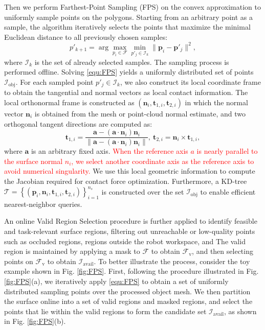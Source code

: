 Then we perform Farthest-Point Sampling (FPS) on the convex approximation to uniformly sample points on the polygons. Starting from an arbitrary point as a sample, the algorithm iteratively selects the points that maximize the minimal Euclidean distance to all previously chosen samples:
\begin{equation}
p'_{k+1} = \arg\max_{p_i \in \mathcal{F}} \min_{p'_j \in \mathcal{I}_{k}} \|\boldsymbol{p}_i - \boldsymbol{p}'_j\|^2, \label{equ:FPS}
\end{equation}
where $\mathcal{I}_{k}$ is the set of already selected samples. The sampling process is performed offline. Solving \eqref{equ:FPS} yields a uniformly distributed set of points $\mathcal{I}_{\text{obj}}$. For each sampled point $p'_j \in \mathcal{I}_{k}$, we also construct its local coordinate frame to obtain the tangential and normal vectors as local contact information. The local orthonormal frame is constructed as $(\boldsymbol{n}_i, \boldsymbol{t}_{1,i}, \boldsymbol{t}_{2,i})$ in which the normal vector $\boldsymbol{n}_i$ is obtained from the mesh or point-cloud normal estimate, and two orthogonal tangent directions are computed as:
\begin{equation}
\boldsymbol{t}_{1,i} =
\frac{\boldsymbol{a} - (\boldsymbol{a} \cdot \boldsymbol{n}_i)\boldsymbol{n}_i}
{\|\boldsymbol{a} - (\boldsymbol{a} \cdot \boldsymbol{n}_i)\boldsymbol{n}_i\|}, \
\boldsymbol{t}_{2,i} = \boldsymbol{n}_i \times \boldsymbol{t}_{1,i},
\end{equation}
where $\boldsymbol{a}$ is an arbitrary fixed axis. \textcolor{red}{When the reference axis $a$ is nearly parallel to the surface normal $n_i$, we select another coordinate axis as the reference axis to avoid numerical singularity.} We use this local geometric information to compute the Jacobian required for contact force optimization. Furthermore, a KD-tree $\mathcal{T}=\left \{ (\boldsymbol{p}_i,\boldsymbol{n}_i, \boldsymbol{t}_{1,i}, \boldsymbol{t}_{2,i}) \right \}^{n_s}_{i=1} $ is constructed over the set $\mathcal{I}_{\text{obj}}$ to enable efficient nearest-neighbor queries.

An online Valid Region Selection procedure is further applied to identify feasible and task-relevant surface regions, filtering out unreachable or low-quality points such as occluded regions, regions outside the robot workspace, and  The valid region is maintained by applying a mask to $\mathcal{F}$ to obtain $\mathcal{F}_{\text{v}}$, and then selecting points on $\mathcal{F}_{\text{v}}$ to obtain $\mathcal{I}_{\text{avail}}$. To better illustrate the process, consider the toy example shown in Fig. \ref{fig:FPS}. First, following the procedure illustrated in Fig. \ref{fig:FPS}(a), we iteratively apply \eqref{equ:FPS} to obtain a set of uniformly distributed sampling points over the processed object mesh. We then partition the surface online into a set of valid regions and masked regions, and select the points that lie within the valid regions to form the candidate set $\mathcal{I}_{\text{avail}}$, as shown in Fig. \ref{fig:FPS}(b).

